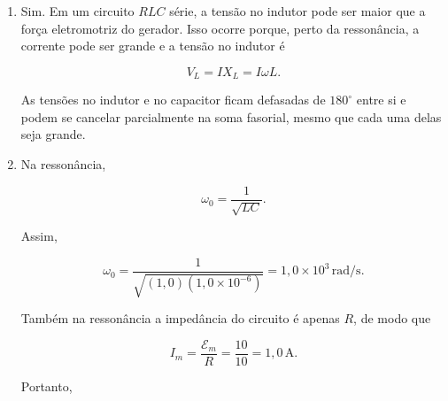 \documentclass[12pt,a4paper]{article}
\begin{document}
\begin{enumerate}
    \item[(a)] Sim. Em um circuito \(RLC\) série, a tensão no indutor pode ser
        maior que a força eletromotriz do gerador. Isso ocorre porque, perto da
            ressonância, a corrente pode ser grande e a tensão no indutor é

                \[
                    V_L=I X_L=I\omega L.
                        \]

                            As tensões no indutor e no capacitor ficam defasadas de \(180^\circ\)
                                entre si e podem se cancelar parcialmente na soma fasorial, mesmo que cada
                                    uma delas seja grande.

                                        \item[(b)] Na ressonância,

                                            \[
                                                \omega_0=\frac{1}{\sqrt{LC}}.
                                                    \]

                                                        Assim,

                                                            \[
                                                                \omega_0=
                                                                    \frac{1}{\sqrt{(1{,}0)(1{,}0\times 10^{-6})}}
                                                                        =1{,}0\times 10^3\,\text{rad/s}.
                                                                            \]

                                                                                Também na ressonância a impedância do circuito é apenas \(R\), de modo que

                                                                                    \[
                                                                                        I_m=\frac{\mathcal{E}_m}{R}
                                                                                            =\frac{10}{10}=1{,}0\,\text{A}.
                                                                                                \]

                                                                                                    Portanto,


\end{enumerate}
\end{document}
